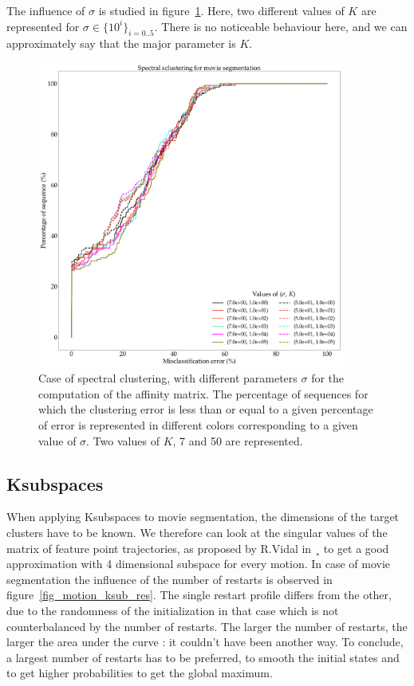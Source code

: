 \documentclass[12pt,a4paper,onecolumn]{article}
\begin{document}
The influence of \(\sigma\) is studied in figure~\ref{fig_motion_sc_res_sigma}. Here, two different values of \(K\) are represented for \(\sigma \in \{10^i\}_{i = 0..5}\). There is no noticeable behaviour here, and we can approximately say that the major parameter is \(K\).

\begin{figure}[H]
	\centering
	\includegraphics[width = 0.9\textwidth]{SC_k_7_50}
	\caption{Case of spectral clustering, with different parameters \(\sigma\) for the computation of the affinity matrix. The percentage of sequences for which the clustering error is less than or equal to a given percentage of error is represented in different colors corresponding to a given value of \(\sigma\). Two values of \(K\), 7 and 50 are represented.}
	\label{fig_motion_sc_res_sigma}
\end{figure}

\subsection{Ksubspaces}

When applying Ksubspaces to movie segmentation, the dimensions of the target clusters have to be known. We therefore can look at the singular values of the matrix of feature point trajectories, as proposed by R.Vidal in \cite{vidal2016PCA}¸ to get a good approximation with 4 dimensional subspace for every motion. In case of movie segmentation the influence of the number of restarts is observed in figure~\ref{fig_motion_ksub_res}. The single restart profile differs from the other, due to the randomness of the initialization in that case which is not counterbalanced by the number of restarts. The larger the number of restarts, the larger the area under the curve : it couldn't have been another way. To conclude, a largest number of restarts has to be preferred, to smooth the initial states and to get higher probabilities to get the global maximum.
\end{document}
